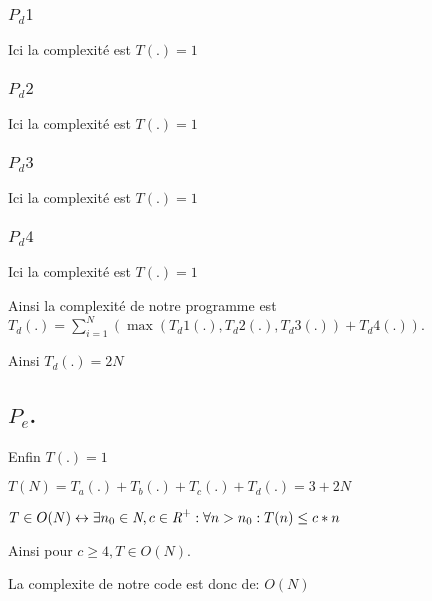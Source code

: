 \subsubsection{$P_d1$}

Ici la complexité est $T(.)=1$

\subsubsection{$P_d2$}

Ici la complexité est $T(.)=1$


\subsubsection{$P_d3$}

Ici la complexité est $T(.)=1$


\subsubsection{$P_d4$}

Ici la complexité est $T(.)=1$


\par 
\par

Ainsi la complexité de notre programme est $T_d(.) = \sum_{i=1}^{N}(\max(T_d1(.), T_d2(.), T_d3(.)) + T_d4(.))$. 
\par
\par
Ainsi $T_d(.)=2N$

\subsection[c]{$P_e$.}

Enfin $T(.)=1$

\vspace{1cm}
$T(N) = T_a(.)+T_b(.)+T_c(.)+T_d(.) =3 + 2N$

\vspace{0.3cm}

$T \in O(N) \leftrightarrow\exists n_0 \in\emph{N}, c \in\emph{R}^+: \forall n>n_0:T(n)\leq c*n$

Ainsi pour $c \geq 4, T \in O(N)$.
\par
\vspace{0.3cm} 
La complexite de notre code est donc de: \textbf{$O(N)$}